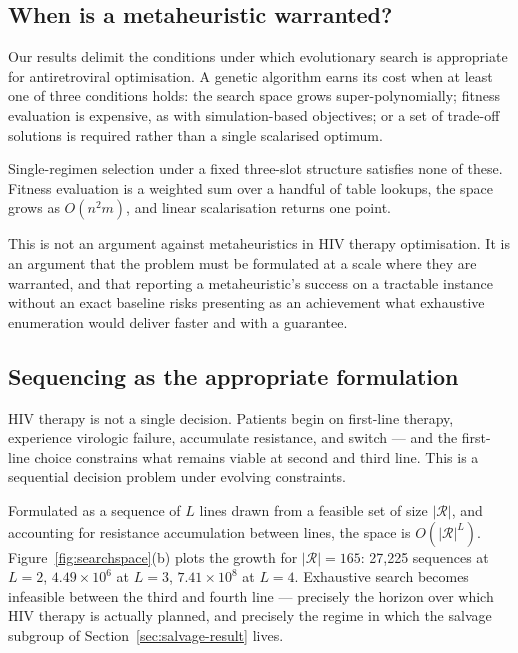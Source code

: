 \documentclass[conference]{IEEEtran}
\begin{document}
\subsection{When is a metaheuristic warranted?}\label{sec:warranted}

Our results delimit the conditions under which evolutionary search is appropriate for antiretroviral optimisation. A genetic algorithm earns its cost when at least one of three conditions holds: the search space grows super-polynomially; fitness evaluation is expensive, as with simulation-based objectives; or a set of trade-off solutions is required rather than a single scalarised optimum.

Single-regimen selection under a fixed three-slot structure satisfies none of these. Fitness evaluation is a weighted sum over a handful of table lookups, the space grows as $O(n^2m)$, and linear scalarisation returns one point.

This is not an argument against metaheuristics in HIV therapy optimisation. It is an argument that the problem must be formulated at a scale where they are warranted, and that reporting a metaheuristic's success on a tractable instance without an exact baseline risks presenting as an achievement what exhaustive enumeration would deliver faster and with a guarantee.

\subsection{Sequencing as the appropriate formulation}\label{sec:sequencing}

HIV therapy is not a single decision. Patients begin on first-line therapy, experience virologic failure, accumulate resistance, and switch --- and the first-line choice constrains what remains viable at second and third line. This is a sequential decision problem under evolving constraints.

Formulated as a sequence of $L$ lines drawn from a feasible set of size $|\mathcal{R}|$, and accounting for resistance accumulation between lines, the space is $O(|\mathcal{R}|^L)$. Figure~\ref{fig:searchspace}(b) plots the growth for $|\mathcal{R}| = 165$: 27,225 sequences at $L = 2$, $4.49 \times 10^6$ at $L = 3$, $7.41 \times 10^8$ at $L = 4$. Exhaustive search becomes infeasible between the third and fourth line --- precisely the horizon over which HIV therapy is actually planned, and precisely the regime in which the salvage subgroup of Section~\ref{sec:salvage-result} lives.
\end{document}

